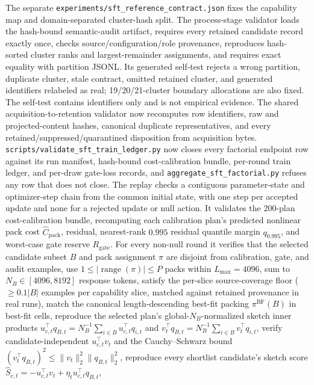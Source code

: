 \documentclass{article}
\begin{document}
The separate \texttt{experiments/sft\_reference\_contract.json} fixes the
capability map and domain-separated cluster-hash split. The process-stage
validator loads the hash-bound semantic-audit artifact, requires every retained
candidate record exactly once, checks source/configuration/role provenance,
reproduces hash-sorted cluster ranks and largest-remainder assignments, and
requires exact equality with partition JSONL. Its generated self-test rejects
a wrong partition, duplicate cluster, stale contract, omitted retained
cluster, and generated identifiers relabeled as real; 19/20/21-cluster
boundary allocations are also fixed. The self-test contains identifiers only
and is not empirical evidence.
The shared acquisition-to-retention validator now recomputes row identifiers,
raw and projected-content hashes, canonical duplicate representatives, and
every retained/suppressed/quarantined disposition from acquisition bytes.
\texttt{scripts/validate\_sft\_train\_ledger.py} now closes every factorial
endpoint row against its run manifest, hash-bound cost-calibration bundle,
per-round train ledger, and per-draw gate-loss records,
and \texttt{aggregate\_sft\_factorial.py} refuses any row that does not close.
The replay checks a contiguous parameter-state and optimizer-step chain from
the common initial state, with one step per accepted update and none for a
rejected update or null action. It validates the 200-plan cost-calibration
bundle, recomputing each calibration plan's predicted nonlinear pack cost
$\widehat C_{\mathrm{pack}}$, residual, nearest-rank $0.995$ residual quantile
margin $q_{0.995}$, and worst-case gate reserve $R_{\mathrm{gate}}$. For every
non-null round it verifies that the selected candidate subset $B$ and pack
assignment $\pi$ are disjoint from calibration, gate, and audit examples, use
$1\le|\operatorname{range}(\pi)|\le P$ packs within $L_{\max}=4096$, sum to
$N_B\in[4096,8192]$ response tokens, satisfy the per-slice source-coverage
floor ($\ge0.1|B|$ examples per capability slice, matched against retained
provenance in real runs), match the canonical length-descending
best-fit packing $\pi^{\mathrm{BF}}(B)$ in best-fit cells, reproduce the
selected plan's global-$N_B$-normalized sketch inner products
$u_{c,t}^\top q_{B,t}=N_B^{-1}\sum_{i\in B}u_{c,t}^\top q_{i,t}$ and
$v_t^\top q_{B,t}=N_B^{-1}\sum_{i\in B}v_t^\top q_{i,t}$, verify candidate-independent
$u_{c,t}^\top v_t$ and the Cauchy--Schwarz bound
$(v_t^\top q_{B,t})^2\le\|v_t\|_2^2\|q_{B,t}\|_2^2$, reproduce every
shortlist candidate's sketch score $\widehat S_{c,t}=-u_{c,t}^\top v_t+\eta_tu_{c,t}^\top q_{B,t}$,
\end{document}
